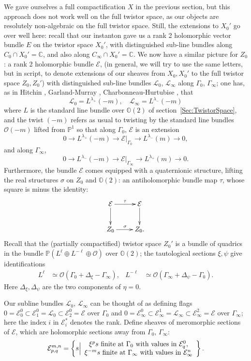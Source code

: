 \documentclass[12pt]{article}
\theoremstyle{definition}
\theoremstyle{remark}
\numberwithin{theorem}{section}
\def\bC{{\mathbb {C}}}
\def\bP{{\mathbb {P}}}
\def\bO{{\mathbb {O}}}
\def\pE{{\mathcal E}}
\def\pL{{\mathcal L}}
\def\pO{{\mathcal O}}
\begin{document}
We gave ourselves a full compactification $X$ in the previous section, but this approach does not work well on the full twistor space, as our objects are resolutely non-algebraic on the full twistor space. Still, the extensions  to $X_0'$ go over well here: recall that our  instanton gave us a rank 2 holomorphic vector bundle $E$ on the twistor space $X_0'$, with distinguished sub-line bundles along $C_0\cap X_0' = \bC$, and also along $C_\infty\cap X_0' = \bC$. We now have a similar picture for $Z_0$: a rank 2 holomorphic bundle $\pE$, (in general, we will try to use the same letters, but in script, to denote extensions of our sheaves from $X_0, X_0'$ to the full twistor space $Z_0, Z_0'$)  with distinguished sub-line bundles 
$\pL_0$, $\pL_\infty$ along $\Gamma_0$, $\Gamma_\infty$; one has, as in Hitchin \cite{Hitchin:1983ay}, Garland-Murray \cite {Garland-Murray}, Charbonneau-Hurtubise \cite{Charbonneau:2007zd}, that 
$$\pL_0 = L^{\lambda_+}(-m),\quad  \pL_\infty = L^{ \lambda_-}(-m)$$
where $L$ is the standard line bundle over $\bO(2)$ of section~\ref{Sec:TwistorSpace}, and the twist $(-m)$ refers as usual to twisting by the standard line bundles $\mathcal{O}(-m)$ lifted from $\bP^1$ so that along $\Gamma_0$, $\pE$ is an extension
$$0\rightarrow L^{\lambda_+}(-m)\rightarrow \pE|_{\Gamma_0} \rightarrow L^{ \lambda_-}(m)\rightarrow 0,$$
and along $\Gamma_\infty$,
$$0\rightarrow L^{\lambda_-}(-m)\rightarrow \pE|_{\Gamma_\infty} \rightarrow L^{ \lambda_+}(m)\rightarrow 0.$$
Furthermore, the bundle $\pE$ comes equipped with a quaternionic structure, lifting the real structures $\sigma$ on $Z_0$ and $\bO(2)$: an antiholomorphic bundle map $\tau$, whose square is minus the identity: 
$$ \xymatrix{  \pE\ar[r]^\tau\ar[d]&\pE\ar[d]\\ Z_0 \ar[r]^\sigma&Z_0.}$$
Recall that the (partially compactified) twistor space $Z_0'$ is a bundle of quadrics in the bundle $\bP(L^\ell\oplus L^{-\ell}\oplus \pO)$ over $\bO(2)$; the tautological sections $\xi, \psi$ give identifications
\begin{align} 
L^\ell& \simeq \pO(\Gamma_0 + \Delta_\xi - \Gamma_\infty),&  
L^{-\ell}& \simeq \pO(\Gamma_\infty + \Delta_\psi - \Gamma_0).
\end{align}
Here $\Delta_\xi,\Delta_\psi$ are the two components of $\eta = 0.$

Our subline bundles $\pL_0$, $\pL_\infty$ can be thought of as defining flags 
$0=\pE^0_0\subset \pE^0_1= \pL_0 \subset \pE^0_2 =\pE$ over $\Gamma_0$ and $0=\pE_\infty^0\subset \pE_\infty^1= \pL_\infty \subset \pE_\infty^2 =\pE$ over  $\Gamma_\infty$; here the index $i$ in $\pE^*_i$ denotes the rank.   Define sheaves of meromorphic sections of $\pE$, which are holomorphic sections away from $\Gamma_0$, $\Gamma_\infty$:
\begin{equation} 
\pE_{p,q}^{m,n}=\left\{s\Big|
\begin{array}{c}\xi^{ p}s\ {\rm finite\ at}\  \Gamma_0\ {\rm with\ values\ in}\ \pE^0_q,\\ \xi^{-m} s\ {\rm finite\ at}\ \Gamma_\infty\ {\rm with\ values\ in}\ \pE_\infty^n
\end{array}
\right\}.
\end{equation}
\end{document}
